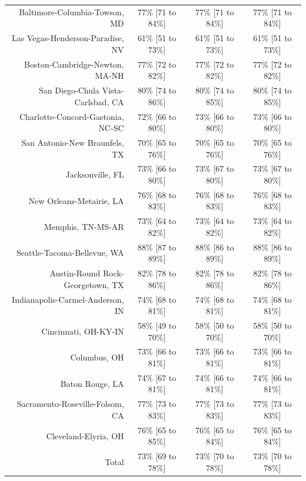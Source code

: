 \documentclass{article}
\begin{document}
\begin{table}[H]
\begin{tabular}{|r|c|c|c|}
		Baltimore-Columbia-Towson, MD & 77\% [71 to 84\%] & 77\% [71 to 84\%] & 77\% [71 to 84\%]\\
		Las Vegas-Henderson-Paradise, NV & 61\% [51 to 73\%] & 61\% [51 to 73\%] & 61\% [51 to 73\%]\\
		Boston-Cambridge-Newton, MA-NH & 77\% [72 to 82\%] & 77\% [72 to 82\%] & 77\% [72 to 82\%]\\
		San Diego-Chula Vista-Carlsbad, CA & 80\% [74 to 86\%] & 80\% [74 to 85\%] & 80\% [74 to 85\%]\\
		Charlotte-Concord-Gastonia, NC-SC & 72\% [66 to 80\%] & 73\% [66 to 80\%] & 73\% [66 to 80\%]\\
		San Antonio-New Braunfels, TX & 70\% [65 to 76\%] & 70\% [65 to 76\%] & 70\% [65 to 76\%]\\
		Jacksonville, FL & 73\% [66 to 80\%] & 73\% [67 to 80\%] & 73\% [67 to 80\%]\\
		New Orleans-Metairie, LA & 76\% [68 to 83\%] & 76\% [68 to 83\%] & 76\% [68 to 83\%]\\
		Memphis, TN-MS-AR & 73\% [64 to 82\%] & 73\% [64 to 82\%] & 73\% [64 to 82\%]\\
		Seattle-Tacoma-Bellevue, WA & 88\% [87 to 89\%] & 88\% [86 to 89\%] & 88\% [86 to 89\%]\\
		Austin-Round Rock-Georgetown, TX & 82\% [78 to 86\%] & 82\% [78 to 86\%] & 82\% [78 to 86\%]\\
		Indianapolis-Carmel-Anderson, IN & 74\% [68 to 81\%] & 74\% [68 to 81\%] & 74\% [68 to 81\%]\\
		Cincinnati, OH-KY-IN & 58\% [49 to 70\%] & 58\% [50 to 70\%] & 58\% [50 to 70\%]\\
		Columbus, OH & 73\% [66 to 81\%] & 73\% [66 to 81\%] & 73\% [66 to 81\%]\\
		Baton Rouge, LA & 74\% [67 to 81\%] & 74\% [66 to 81\%] & 74\% [66 to 81\%]\\
		Sacramento-Roseville-Folsom, CA & 77\% [73 to 83\%] & 77\% [73 to 83\%] & 77\% [73 to 83\%]\\
		Cleveland-Elyria, OH & 76\% [65 to 85\%] & 76\% [65 to 84\%] & 76\% [65 to 84\%]\\
		\hline
		Total & 73\% [69 to 78\%] & 73\% [70 to 78\%] & 73\% [70 to 78\%]\\
		
		\hline
	\end{tabular}
\end{table}




\newpage
\end{document}
